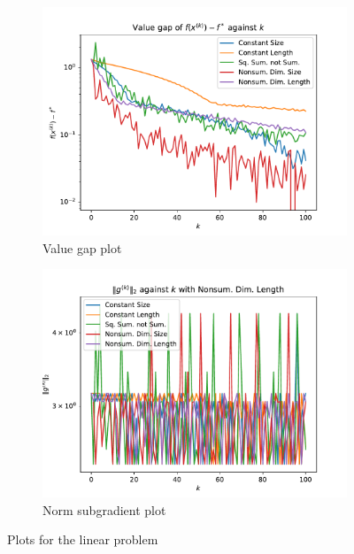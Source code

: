 \documentclass[journal,onecolumn]{IEEEtran}
\begin{document}
\begin{figure}[tbp]
    \centering
    \begin{subfigure}{0.49\textwidth}
        \centering
        \includegraphics[width = \linewidth]{Figures/Linear Example Value Gap.pdf}
        \caption{Value gap plot}
        \label{fig:linear value gap}
    \end{subfigure}
    \begin{subfigure}{0.49\textwidth}
        \centering
        \includegraphics[width = \linewidth]{Figures/Linear Example Subgradient Norm.pdf}
        \caption{Norm subgradient plot}
        \label{fig:linear sg norm}
    \end{subfigure}
    \caption{Plots for the linear problem}
    \label{fig:gd}
\end{figure}
\end{document}

